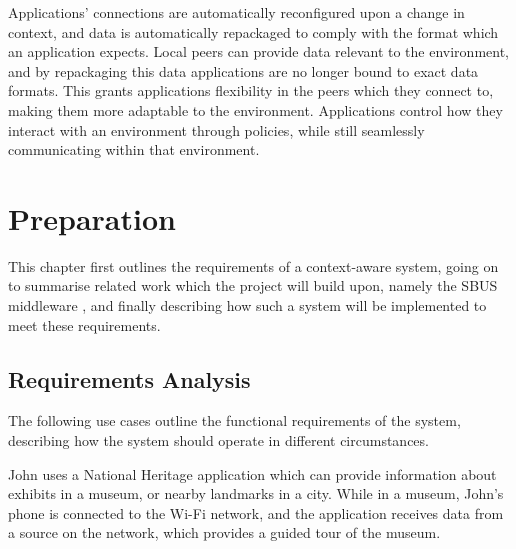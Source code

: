 \documentclass[12pt,twoside,notitlepage]{report}
\begin{document}
Applications' connections are automatically reconfigured upon a change in context, and data is automatically repackaged to comply with the format which an application expects. 
Local peers can provide data relevant to the environment, and by repackaging this data applications are no longer bound to exact data formats. 
This grants applications flexibility in the peers which they connect to, making them more adaptable to the environment. 
Applications control how they interact with an environment through policies, while still seamlessly communicating within that environment.

\cleardoublepage

 
\chapter{Preparation}

This chapter first outlines the requirements of a context-aware system, going on to summarise related work which the project will build upon, namely the SBUS middleware \cite{ingram2009reconfigurable}, and finally describing how such a system will be implemented to meet these requirements.


\section{Requirements Analysis}

The following use cases outline the functional requirements of the system, describing how the system should operate in different circumstances.

John uses a National Heritage application which can provide information about exhibits in a museum, or nearby landmarks in a city. 
While in a museum, John's phone is connected to the Wi-Fi network, and the application receives data from a source on the network, which provides a guided tour of the museum. 
\end{document}
